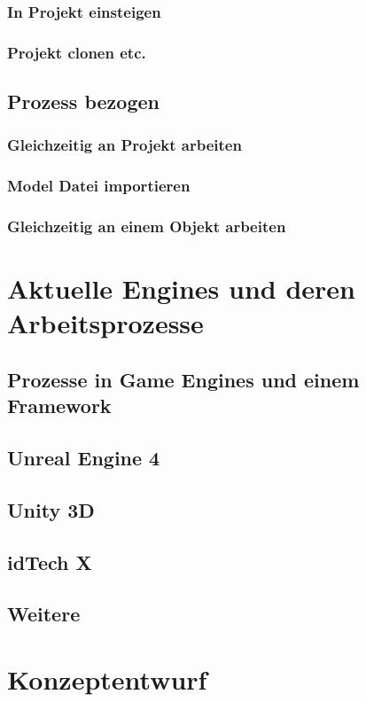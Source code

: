 \documentclass[pagesize, paper=a4, fontsize=12pt,titlepage=true, headings=small, headnosepline, abstractoff, liststotoc, nochapterprefix, plainheadsepline, twoside]{scrreprt}
\begin{document}
\subsubsection{In Projekt einsteigen}
\subsubsection{Projekt clonen etc.}

\subsection{Prozess bezogen}
\subsubsection{Gleichzeitig an Projekt arbeiten}
\subsubsection{Model Datei importieren}
\subsubsection{Gleichzeitig an einem Objekt arbeiten}

\section{Aktuelle Engines und deren Arbeitsprozesse}
\subsection{Prozesse in Game Engines und einem Framework}
\subsection{Unreal Engine 4}
\subsection{Unity 3D}
\subsection{idTech X}
\subsection{Weitere}

\section{Konzeptentwurf}
\end{document}
